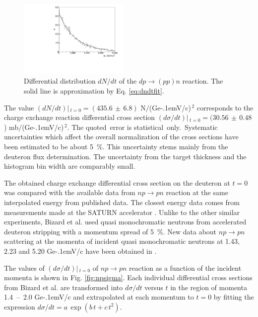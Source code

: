 \documentclass[twocolumn,epjc3]{svjour3}
\newcommand{\np}     {\ensuremath{np \rightarrow pn}\xspace}
\newcommand{\dpchex} {\ensuremath{dp \rightarrow (pp)n}\xspace}
\newcommand{\GeVc}   {Ge\kern-.1emV/c\xspace}
\begin{document}
\begin{figure}[h]
  \centering
  \includegraphics[width=0.47\textwidth]{dp_dN.pdf}
  \caption{Differential distribution $dN/dt$ of the \dpchex reaction. The solid
    line is approximation by Eq. \eqref{eq:dndtfit}.}
  \label{fig:dndt}
\end{figure}

The value $(dN/dt)|\,_{t=0}=(435.6\,\pm\,6.8)$ N$/$(\GeVc)$^{\,2}$ corresponds
to the charge exchange reaction differential cross section
$(d\sigma/dt)|\,_{t=0}=(30.56\,\pm\,0.48$) mb$/$(\GeVc)$^{\,2}$.
The quoted \,error is statistical \,only. \,Systematic uncertainties which
affect the overall normalization of the cross sections have been estimated to be
about 5~\%. This uncertainty stems mainly from the deuteron flux determination.
The uncertainty from the target thickness and the histogram bin width are
comparably small.

The obtained charge exchange differential cross section on the deuteron at $t=0$
was compared with the available data from \np reaction at the same interpolated
energy from published data. The closest energy data comes from measurements made
at the SATURN accelerator \cite{biz75,bys78}. Unlike to the other similar
experiments, Bizard et al. \cite{biz75} used quasi monochromatic neutrons from
accelerated deuteron stripping with a momentum spread of 5~\%. New data about
\np scattering at the momenta of incident quasi monochromatic neutrons at 1.43,
2.23 and 5.20 \GeVc have been obtained in \cite{tro14}.

The values of $(d\sigma/dt)|\,_{t=0}$ of \np reaction as a function of the
incident momenta is shown in Fig. \ref{fig:npsigma}. Each individual
differential cross sections from Bizard et al. \cite{biz75} are transformed into
$d\sigma/dt$ versus $t$ in the region of momenta 1.4~--~2.0 \GeVc and
extrapolated at each momentum to $t=0$ by fitting the expression
$d\sigma/dt = a\,\exp(b\,t + c\,t^2)$.
\end{document}
